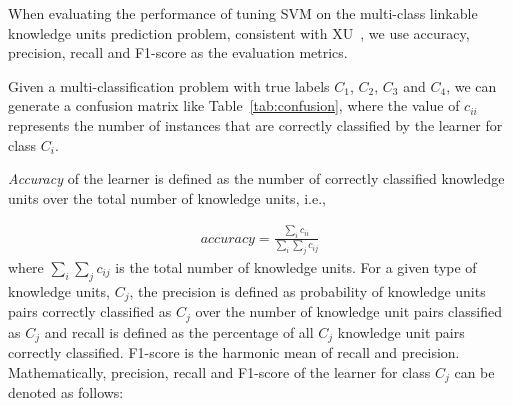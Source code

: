 \documentclass[sigconf]{acmart}
\theoremstyle{break}
\newcommand{\tab}[1]{Table~\ref{tab:#1}}
\begin{document}
\begin{table}[htp]
\caption {Confusion Matrix.}
\scriptsize
{}

\label{tab:confusion}
\end{table}

When evaluating the performance of tuning SVM on the
multi-class linkable knowledge units prediction problem,
consistent with XU~\cite{xu2016predicting}, we use accuracy, precision, recall and F1-score
as the evaluation metrics.



Given a multi-classification problem with true labels $C_1$, 
$C_2$, $C_3$ and $C_4$, we can generate a confusion matrix like \tab{confusion}, 
where the value of $c_{ii}$ represents the number of instances that are correctly classified
by the learner for class $C_i$. 

{\it Accuracy} of the learner is defined as the number of  correctly
classified knowledge units over the total number of knowledge units, i.e.,


{\[
\begin{array}{ll}
accuracy = \frac{\sum_i c_{ii}}{\sum_{i}\sum_{j}c_{ij}}
\end{array}
\]}
where ${\sum_{i}\sum_{j}c_{ij}}$ is the total number of knowledge units.
For a given type of knowledge units, $C_j$, the  precision is defined as probability of
knowledge units pairs correctly classified as $C_j$ over the number of knowledge unit pairs classified as $C_j$ and
 recall is defined as the percentage of all $C_j$ knowledge unit pairs correctly classified. F1-score is the harmonic mean of
 recall and precision. Mathematically,
  precision, recall and  F1-score of 
the learner for class $C_j$ can be denoted as follows:
\end{document}
